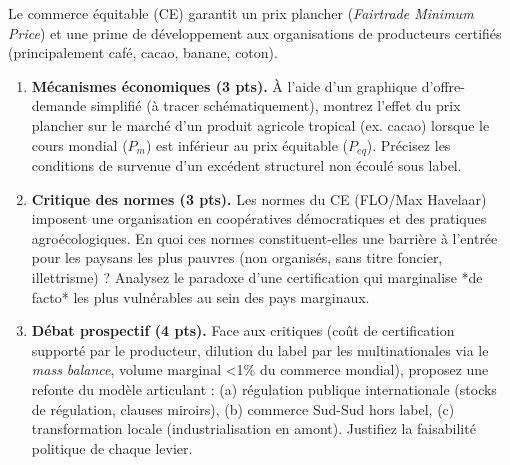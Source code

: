 \documentclass[11pt]{article}
\begin{document}
\begin{exercice}
\noindent Le commerce équitable (CE) garantit un prix plancher (\textit{Fairtrade Minimum Price}) et une prime de développement aux organisations de producteurs certifiés (principalement café, cacao, banane, coton).

\begin{enumerate}
\item \textbf{Mécanismes économiques (3 pts).} À l'aide d'un graphique d'offre-demande simplifié (à tracer schématiquement), montrez l'effet du prix plancher sur le marché d'un produit agricole tropical (ex. cacao) lorsque le cours mondial ($P_m$) est inférieur au prix équitable ($P_{eq}$). Précisez les conditions de survenue d'un excédent structurel non écoulé sous label.
\item \textbf{Critique des normes (3 pts).} Les normes du CE (FLO/Max Havelaar) imposent une organisation en coopératives démocratiques et des pratiques agroécologiques. En quoi ces normes constituent-elles une barrière à l'entrée pour les paysans les plus pauvres (non organisés, sans titre foncier, illettrisme) ? Analysez le paradoxe d'une certification qui marginalise *de facto* les plus vulnérables au sein des pays marginaux.
\item \textbf{Débat prospectif (4 pts).} Face aux critiques (coût de certification supporté par le producteur, dilution du label par les multinationales via le \textit{mass balance}, volume marginal \textless 1\% du commerce mondial), proposez une refonte du modèle articulant : (a) régulation publique internationale (stocks de régulation, clauses miroirs), (b) commerce Sud-Sud hors label, (c) transformation locale (industrialisation en amont). Justifiez la faisabilité politique de chaque levier.
\end{enumerate}
\end{exercice}
\end{document}
